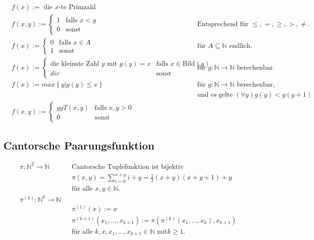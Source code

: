 \documentclass[10pt,oneside,a4paper]{scrartcl}
\begin{document}
\begin{align}
    &f(x) := \text{ die $x$-te Primzahl}\\
    &f(x, y) := \left\{
        \begin{array}{ll}
        1 & \text{falls }x<y\\
        0 & \text{sonst}
        \end{array}\right.
        && \text{Entsprechend für $\leq, =, \geq, >, \neq$.}\\
    &f(x) := \left\{\begin{array}{ll}
        0 & \text{falls } x\in A\\
        1 & \text{sonst}
        \end{array}\right.
        && \text{für }A\subseteq\mathbb{N}\text{ endlich. }\\
    &f(x) := \left\{\begin{array}{ll}
        \text{die kleinste Zahl $y$ mit $g(y) = x$} &
        \text{falls }x\in \text{Bild}(g)\\
        div & \text{sonst}
        \end{array}\right.
        && \text{für }g:\mathbb{N}\longrightarrow \mathbb{N}
           \text{ berechenbar.}\\
    &f(x) := max\left\{y | g(y) \leq x\right\}
        && \text{für }g:\mathbb{N}\longrightarrow \mathbb{N}
           \text{ berechenbar,}\nonumber\\
        &&& \text{und es gelte $(\forall y) g(y) < g(y+1)$}\\
    &f(x, y) := \left\{
        \begin{array}{ll}
        ggT(x, y) & \text{falls }x, y > 0\\
        0 & \text{sonst}
        \end{array}\right.
    \end{align}

    \subsection{Cantorsche Paarungsfunktion}

    \begin{align}
    &\pi : \mathbb{N}^2 \longrightarrow \mathbb{N}
            &&\text{Cantorsche Tuplefunktion ist bijektiv}\nonumber\\
            &&&\pi(x, y) = \sum^{x+y}_{i = 0} i+y =\frac{1}{2}(x+y)(x+y+1)+y\\
            &&&\text{für alle $x, y \in \mathbb{N}$.}\nonumber\\
    &\pi^{(k)} : \mathbb{N}^k \longrightarrow \mathbb{N}\nonumber &&\\
            &&&\pi^{(1)}(x) := x\nonumber\\
            &&&\pi^{(k+1)}(x_1, \ldots, x_{k+1}) :=
               \pi (\pi^{(k)}(x_1, \ldots, x_k), x_{k+1})\\
            &&&\text{für alle $k, x, x_1, \ldots, x_{k+1} \in \mathbb{N}$ mit}
               \text{$k \geq 1$.}\nonumber\\
    \end{align}
\end{document}
